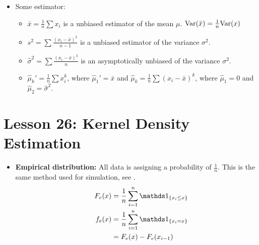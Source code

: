 \documentclass[10pt, french]{article}
\begin{document}
\begin{multicols*}{3}
\begin{itemize}[align=left,leftmargin=*]
    \item Some estimator:
    \begin{itemize}
        \item $\bar{x}=\frac{1}{n}\sum x_i$ is a unbiased estimator of the mean $\mu$. $\mathrm{Var} {\left( \bar{x} \right)}=\frac{1}{n}\mathrm{Var} {\left( x \right)}$
        \item $s^2=\sum \frac{(x_i-\bar{x})^2}{n-1}$ is a unbiased estimator of the variance $\sigma^2$.
        \item $\hat{\sigma}^2=\sum \frac{(x_i-\bar{x})^2}{n}$ is an asymptotically unbiased of the variance $\sigma^2$.
        \item $\hat{\mu}_k'=\frac{1}{n}\sum x_i^k$, where $\hat{\mu}_1'=\bar{x}$ and $\hat{\mu}_k=\frac{1}{n}\sum (x_i - \bar{x})^k$, where $\hat{\mu}_1=0$ and $\hat{\mu}_2=\hat{\sigma}^2$.
    \end{itemize}
\end{itemize}

\section*{Lesson 26: Kernel Density Estimation}
\begin{itemize}[align=left,leftmargin=*]
    \item \textbf{Empirical distribution:} All data is assigning a probability of $\frac{1}{n}$. This is the same method used for simulation, see {\color{orange}}.
    \begin{align*}
        \hspace*{.5cm}
        F_e(x) &= \frac{1}{n} \sum\limits_{i=1}^{n} \indic{x_i \leq x} \\
        f_e(x) &= \frac{1}{n} \sum\limits_{i=1}^{n} \indic{x_i = x} \\
               &= F_e(x) - F_e(x_{i-1})
    \end{align*} 
    

\end{itemize}
\end{multicols*}
\end{document}
